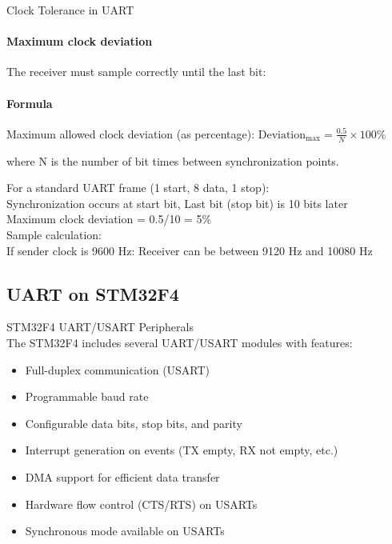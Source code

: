 \begin{KR}{Clock Tolerance in UART}
\paragraph{Maximum clock deviation}
The receiver must sample correctly until the last bit:
\paragraph{Formula}
Maximum allowed clock deviation (as percentage):
$\text{Deviation}_{\max} = \frac{0.5}{N} \times 100\%$

where N is the number of bit times between synchronization points.
\end{KR}

\begin{example}
    For a standard UART frame (1 start, 8 data, 1 stop):\\
    Synchronization occurs at start bit,
    Last bit (stop bit) is 10 bits later\\
    Maximum clock deviation = 0.5/10 = 5\%\\
    Sample calculation:\\
    If sender clock is 9600 Hz: Receiver can be between 9120 Hz and 10080 Hz
\end{example}

\multend


\subsection{UART on STM32F4}

\begin{concept}{STM32F4 UART/USART Peripherals}\\
The STM32F4 includes several UART/USART modules with features:
\begin{itemize}
    \item Full-duplex communication (USART)
    \item Programmable baud rate
    \item Configurable data bits, stop bits, and parity
    \item Interrupt generation on events (TX empty, RX not empty, etc.)
    \item DMA support for efficient data transfer
    \item Hardware flow control (CTS/RTS) on USARTs
    \item Synchronous mode available on USARTs
\end{itemize}
\end{concept}

